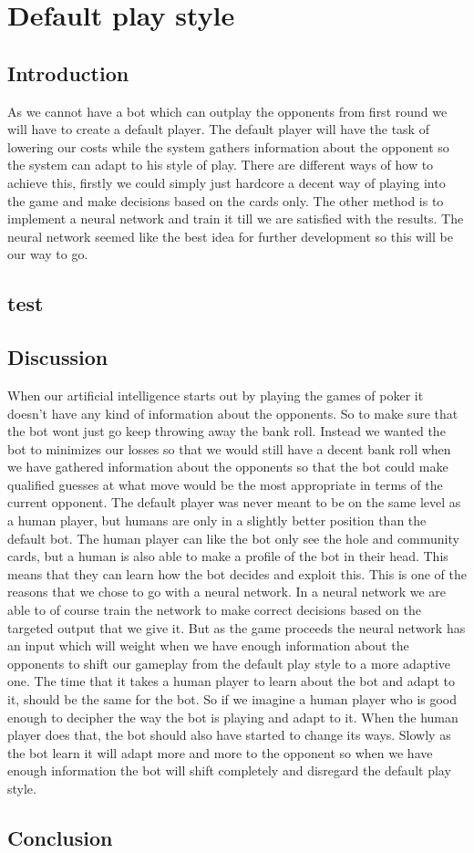 \section{Default play style}

\subsection{Introduction}
As we cannot have a bot which can outplay the opponents from first round we will have to create a default player. The default player will have the task of lowering our costs while the system gathers information about the opponent so the system can adapt to his style of play. There are different ways of how to achieve this, firstly we could simply just hardcore a decent way of playing into the game and make decisions based on the cards only. The other method is to implement a neural network and train it till we are satisfied with the results. The neural network seemed like the best idea for further development so this will be our way to go.

\subsection{test}


\subsection{Discussion}
When our artificial intelligence starts out by playing the games of poker it doesn't have any kind of information about the opponents. So to make sure that the bot wont just go keep throwing away the bank roll. Instead we wanted the bot to minimizes our losses so that we would still have a decent bank roll when we have gathered information about the opponents so that the bot could make qualified guesses at what move would be the most appropriate in terms of the current opponent. The default player was never meant to be on the same level as a human player, but humans are only in a slightly better position than the default bot. The human player can like the bot only see the hole and community cards, but a human is also able to make a profile of the bot in their head. This means that they can learn how the bot decides and exploit this. 
This is one of the reasons that we chose to go with a neural network. In a neural network we are able to of course train the network to make correct decisions based on the targeted output that we give it.
But as the game proceeds the neural network has an input which will weight when we have enough information about the opponents to shift our gameplay from the default play style to a more adaptive one.
The time that it takes a human player to learn about the bot and adapt to it, should be the same for the bot. So if we imagine a human player who is good enough to decipher the way the bot is playing and adapt to it. When the human player does that, the bot should also have started to change its ways. Slowly as the bot learn it will adapt more and more to the opponent so when we have enough information the bot will shift completely and disregard the default play style.

\subsection{Conclusion}
